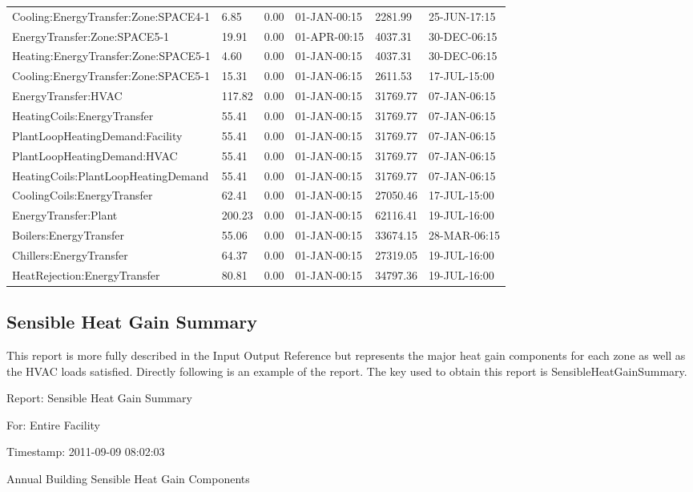 {\begin{longtable}[c]{>{\raggedright}p{1.0in}>{\raggedright}p{1.0in}>{\raggedright}p{1.0in}>{\raggedright}p{1.0in}>{\raggedright}p{1.0in}>{\raggedright}p{1.0in}}
Cooling\-:EnergyTransfer\-:Zone\-:SPACE4-1 & 6.85 & 0.00 & 01-JAN-00\-:15 & 2281.99 & 25-JUN-17\-:15 \tabularnewline
EnergyTransfer\-:Zone\-:SPACE5-1 & 19.91 & 0.00 & 01-APR-00\-:15 & 4037.31 & 30-DEC-06\-:15 \tabularnewline
Heating\-:EnergyTransfer\-:Zone\-:SPACE5-1 & 4.60 & 0.00 & 01-JAN-00\-:15 & 4037.31 & 30-DEC-06\-:15 \tabularnewline
Cooling\-:EnergyTransfer\-:Zone\-:SPACE5-1 & 15.31 & 0.00 & 01-JAN-06\-:15 & 2611.53 & 17-JUL-15\-:00 \tabularnewline
EnergyTransfer\-:HVAC & 117.82 & 0.00 & 01-JAN-00\-:15 & 31769.77 & 07-JAN-06\-:15 \tabularnewline
HeatingCoils\-:EnergyTransfer & 55.41 & 0.00 & 01-JAN-00\-:15 & 31769.77 & 07-JAN-06\-:15 \tabularnewline
PlantLoop\-Heating\-Demand\-:Facility & 55.41 & 0.00 & 01-JAN-00\-:15 & 31769.77 & 07-JAN-06\-:15 \tabularnewline
PlantLoop\-Heating\-Demand\-:HVAC & 55.41 & 0.00 & 01-JAN-00\-:15 & 31769.77 & 07-JAN-06\-:15 \tabularnewline
HeatingCoils\-:PlantLoop\-Heating\-Demand & 55.41 & 0.00 & 01-JAN-00\-:15 & 31769.77 & 07-JAN-06\-:15 \tabularnewline
CoolingCoils\-:EnergyTransfer & 62.41 & 0.00 & 01-JAN-00\-:15 & 27050.46 & 17-JUL-15\-:00 \tabularnewline
EnergyTransfer\-:Plant & 200.23 & 0.00 & 01-JAN-00\-:15 & 62116.41 & 19-JUL-16\-:00 \tabularnewline
Boilers\-:EnergyTransfer & 55.06 & 0.00 & 01-JAN-00\-:15 & 33674.15 & 28-MAR-06\-:15 \tabularnewline
Chillers\-:EnergyTransfer & 64.37 & 0.00 & 01-JAN-00\-:15 & 27319.05 & 19-JUL-16\-:00 \tabularnewline
HeatRejection\-:EnergyTransfer & 80.81 & 0.00 & 01-JAN-00\-:15 & 34797.36 & 19-JUL-16\-:00 \tabularnewline
\bottomrule
\end{longtable}}

\subsection{Sensible Heat Gain Summary}\label{sensible-heat-gain-summary}

This report is more fully described in the Input Output Reference but represents the major heat gain components for each zone as well as the HVAC loads satisfied. Directly following is an example of the report. The key used to obtain this report is SensibleHeatGainSummary.

Report: Sensible Heat Gain Summary

For: Entire Facility

Timestamp: 2011-09-09 08:02:03

Annual Building Sensible Heat Gain Components

